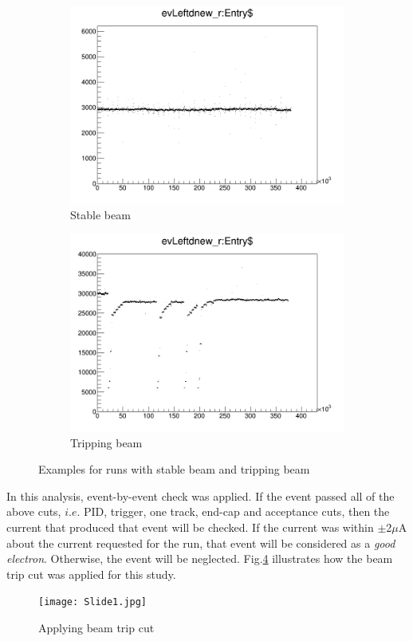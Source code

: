 \documentclass[11pt]{article}
\begin{document}
\begin{enumerate}
\begin{figure}[H]
\centering
\begin{subfigure}{.4\textwidth}
\centering
 \includegraphics[width=\linewidth]{stable.png}
  \caption{Stable beam}
  \label{fig:stable}
\end{subfigure}
\begin{subfigure}{.4\textwidth}
 \includegraphics[width=\linewidth]{909.png}
  \caption{Tripping beam}
  \label{fig:909}
\end{subfigure}
\caption{Examples for runs with stable beam and tripping beam}
\label{fig:beam}
\end{figure}
In this analysis, event-by-event check was applied. If the event passed all of the above cuts, $i.e.$ PID, trigger, one track, end-cap and acceptance cuts, then the current that produced that event will be checked. If the current was within $\pm$2$\mu$A  about the current requested for the run, that event will be considered as a \emph{good electron}. Otherwise, the event will be neglected. Fig.\ref{fig:beam} illustrates how the beam trip cut was applied for this study.
 \begin{figure}[H]
\centering
 \texttt{[image: Slide1.jpg]}
  \caption{Applying beam trip cut }
  \label{fig:beam}
\end{figure}
\end{enumerate}
\end{document}
